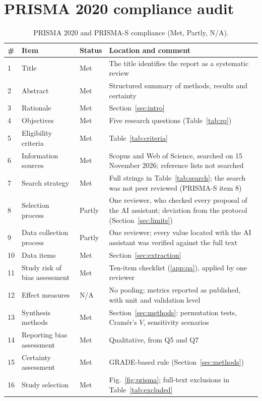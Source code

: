 \documentclass[preprint,12pt]{elsarticle}
\begin{document}
\section{PRISMA 2020 compliance audit}\label{app:prisma}
\begin{longtable}{@{}L{0.9cm}L{4.2cm}L{1.6cm}L{7.9cm}@{}}\caption{PRISMA 2020 and PRISMA-S compliance (Met, Partly, N/A).}\\\toprule \# & Item & Status & Location and comment\\\midrule{} & Title & Met & The title identifies the report as a systematic review\\
2 & Abstract & Met & Structured summary of methods, results and certainty\\
3 & Rationale & Met & Section~\ref{sec:intro}\\
4 & Objectives & Met & Five research questions (Table~\ref{tab:rq})\\
5 & Eligibility criteria & Met & Table~\ref{tab:criteria}\\
6 & Information sources & Met & Scopus and Web of Science, searched on 15 November 2026; reference lists not searched\\
7 & Search strategy & Met & Full strings in Table~\ref{tab:search}; the search was not peer reviewed (PRISMA-S item 8)\\
8 & Selection process & Partly & One reviewer, who checked every proposal of the AI assistant; deviation from the protocol (Section~\ref{sec:limits})\\
9 & Data collection process & Partly & One reviewer; every value located with the AI assistant was verified against the full text\\
10 & Data items & Met & Section~\ref{sec:extraction}\\
11 & Study risk of bias assessment & Met & Ten-item checklist (\ref{app:qa}), applied by one reviewer\\
12 & Effect measures & N/A & No pooling; metrics reported as published, with unit and validation level\\
13 & Synthesis methods & Met & Section~\ref{sec:methods}: permutation tests, Cram\'er's $V$, sensitivity scenarios\\
14 & Reporting bias assessment & Met & Qualitative, from Q5 and Q7\\
15 & Certainty assessment & Met & GRADE-based rule (Section~\ref{sec:methods})\\
16 & Study selection & Met & Fig.~\ref{fig:prisma}; full-text exclusions in Table~\ref{tab:excluded}\\

\end{longtable}
\end{document}
